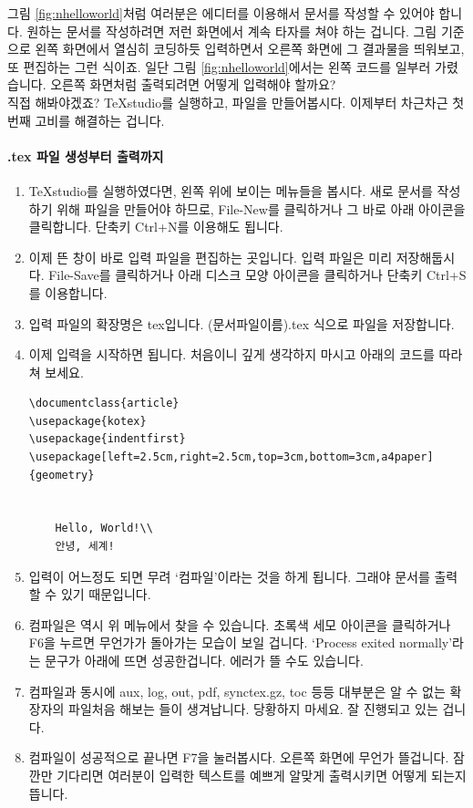 그림 \ref{fig:nhelloworld}처럼 여러분은 에디터를 이용해서 문서를 작성할 수 있어야 합니다. 원하는 문서를 작성하려면 저런 화면에서 계속 타자를 쳐야 하는 겁니다. 그림 기준으로 왼쪽 화면에서 열심히 코딩하듯 입력하면서 오른쪽 화면에 그 결과물을 띄워보고, 또 편집하는 그런 식이죠. 일단 그림 \ref{fig:nhelloworld}에서는 왼쪽 코드를 일부러 가렸습니다. 오른쪽 화면처럼 출력되려면 어떻게 입력해야 할까요?\\
직접 해봐야겠죠? TeXstudio를 실행하고, 파일을 만들어봅시다. 이제부터 차근차근 첫 번째 고비를 해결하는 겁니다.

\paragraph{.tex 파일 생성부터 출력까지}
\begin{enumerate}
	\item TeXstudio를 실행하였다면, 왼쪽 위에 보이는 메뉴들을 봅시다. 새로 문서를 작성하기 위해 파일을 만들어야 하므로, File-New를 클릭하거나 그 바로 아래 아이콘을 클릭합니다. 단축키 Ctrl+N를 이용해도 됩니다.
	\item 이제 뜬 창이 바로 입력 파일을 편집하는 곳입니다. 입력 파일은 미리 저장해둡시다. File-Save를 클릭하거나 아래 디스크 모양 아이콘을 클릭하거나 단축키 Ctrl+S를 이용합니다. 
	\item 입력 파일의 확장명은 tex입니다. (문서파일이름).tex 식으로 파일을 저장합니다.
	\item 이제 입력을 시작하면 됩니다.
          처음이니 깊게 생각하지 마시고 아래의 코드를 따라 쳐 보세요.
    \begin{Verbatim}[frame=single]
\documentclass{article}
\usepackage{kotex}
\usepackage{indentfirst}
\usepackage[left=2.5cm,right=2.5cm,top=3cm,bottom=3cm,a4paper]{geometry}
	

	Hello, World!\\
	안녕, 세계!

	\end{Verbatim}

	\item 입력이 어느정도 되면 무려 `컴파일'이라는 것을 하게 됩니다. 그래야 문서를 출력할 수 있기 때문입니다.
	\item 컴파일은 역시 위 메뉴에서 찾을 수 있습니다. 초록색 세모 아이콘을 클릭하거나 F6을 누르면 무언가가 돌아가는 모습이 보일 겁니다. `Process exited normally'라는 문구가 아래에 뜨면 성공한겁니다. 에러가 뜰 수도 있습니다.
	\item 컴파일과 동시에 aux, log, out, pdf, synctex.gz, toc 등등 대부분은 알 수 없는 확장자의 파일처음 해보는 들이 생겨납니다. 당황하지 마세요. 잘 진행되고 있는 겁니다.
	\item 컴파일이 성공적으로 끝나면 F7을 눌러봅시다. 오른쪽 화면에 무언가 뜰겁니다. 잠깐만 기다리면 여러분이 입력한 텍스트를 예쁘게 알맞게 출력시키면 어떻게 되는지 뜹니다.
\end{enumerate}

